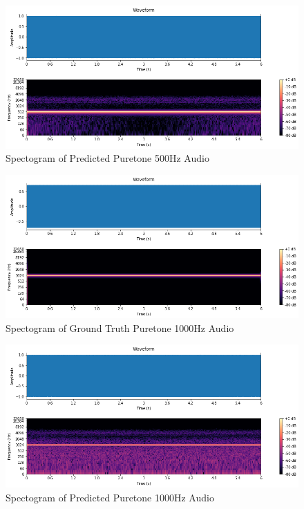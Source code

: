 \documentclass{ioereport}
\begin{document}
    \begin{figure}[H]
        \centering
        \includegraphics[width=\linewidth]{assets/audio_results/puretone500hzpred.png}
        \caption{Spectogram of Predicted Puretone 500Hz Audio}
        \label{fig:pred-pure500-spec}
    \end{figure}

    \begin{figure}[H]
        \centering
        \includegraphics[width=\linewidth]{assets/audio_results/puretone1000hz.png}
        \caption{Spectogram of Ground Truth Puretone 1000Hz Audio}
        \label{fig:gt-pure1000-spec}
    \end{figure}
    
    \begin{figure}[H]
        \centering
        \includegraphics[width=\linewidth]{assets/audio_results/puretone1000hzpred.png}
        \caption{Spectogram of Predicted Puretone 1000Hz Audio}
        \label{fig:pred-pure1000-spec}
    \end{figure}
\end{document}
